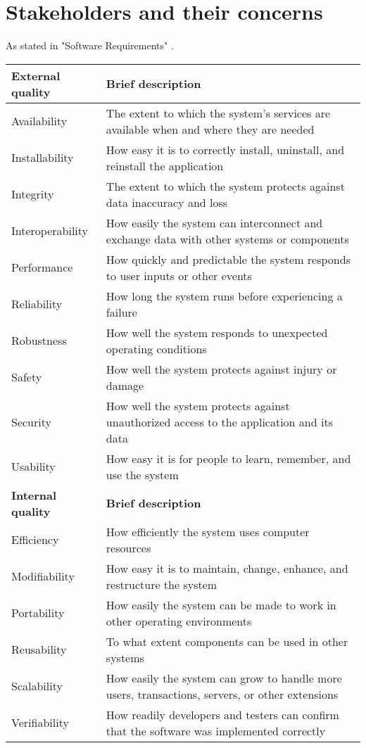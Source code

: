 \section{Stakeholders and their concerns}

As stated in "Software Requirements" \cite{wiegers2013software}.\\
\begin{tabular}{|L{}|L{}|}
\toprule
\textbf{External quality} & \textbf{Brief description} \\ \midrule
Availability & The extent to which the system's services are available when and where they are needed\\
Installability & How easy it is to correctly install, uninstall, and reinstall the application \\
Integrity & The extent to which the system protects against data inaccuracy and loss\\
Interoperability & How easily the system can interconnect and exchange data with other systems or components\\
Performance & How quickly and predictable the system responds to user inputs or other events\\
Reliability & How long the system runs before experiencing a failure \\
Robustness & How well the system responds to unexpected operating conditions\\
Safety & How well the system protects against injury or damage\\
Security & How well the system protects against unauthorized access to the application and its data\\
Usability & How easy it is for people to learn, remember, and use the system\\
\midrule
\textbf{Internal quality} & \textbf{Brief description} \\ \midrule
Efficiency & How efficiently the system uses computer resources\\
Modifiability & How easy it is to maintain, change, enhance, and restructure the system\\
Portability & How easily the system can be made to work in other operating environments\\
Reusability & To what extent components can be used in other systems\\
Scalability & How easily the system can grow to handle more users, transactions, servers, or other extensions\\
Verifiability & How readily developers and testers can confirm that the software was implemented correctly\\
\bottomrule
\end{tabular}

